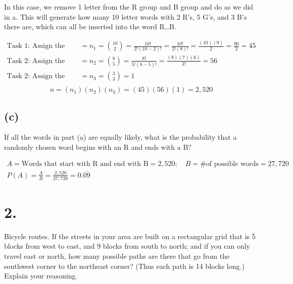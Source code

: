     \begin{mdframed}
        In this case, we remove 1 letter from the R group and B group and do as we did in a. This will generate how many 10 letter words with 2 R's, 5 G's, and 3 B's there are, which can all be inserted into the word R\dots B.

        \begin{align*}
            \text{Task 1: Assign the positions of the 2 R's} & = n_1 = {10 \choose 2} = \frac{10!}{2! (10-2)!} = \frac{10!}{2! (8)!} = \frac{(10)(9)}{2} = \frac{90}{2} = 45   \\
            \text{Task 2: Assign the positions of the 5 G's} & = n_2 = {8 \choose 5} = \frac{8!}{5!(8-5)!} = \frac{(8)(7)(6)}{3!} = 56   \\
            \text{Task 2: Assign the positions of the 3 G's} & = n_3 = {3 \choose 3} = 1 \\
        \end{align*}
        \begin{equation*}
            n = (n_1)(n_2)(n_3) = (45)(56)(1) = \boxed{2,520}
        \end{equation*}
    \end{mdframed}

    \pagebreak

    \subsection*{(c)}
    If all the words in part (a) are equally likely, what is the probability that a randomly chosen word begins with an R and ends with a B?

    \begin{mdframed}
        \begin{equation*}
            \begin{gathered}
                A = \text{Words that start with R and end with B} = 2,520; \quad B = \text{\# of possible words} = 27,720 \\
                P(A) = \frac{A}{B} = \frac{2,520}{27,720} = \boxed{0.\overline{09}}
            \end{gathered}
        \end{equation*}
    \end{mdframed}

    \section*{2.}
    Bicycle routes. If the streets in your area are built on a rectangular grid that is 5 blocks from west to east, and 9 blocks from south to north; and if you can only travel east or north, how many possible paths are there that go from the southwest corner to the northeast corner? (Thus each path is 14 blocks long.) Explain your reasoning.

